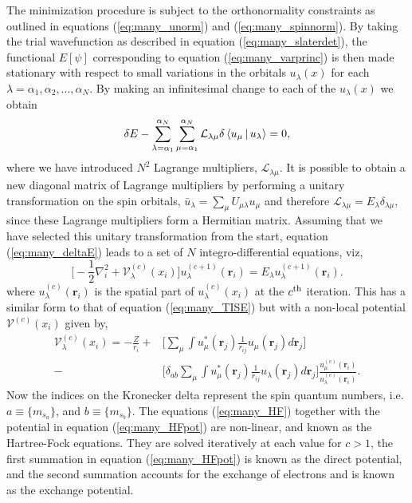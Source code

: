 The minimization procedure is subject to the orthonormality constraints as outlined in equations (\ref{eq:many_unorm}) and (\ref{eq:many_spinnorm}). By taking the trial wavefunction as described in equation (\ref{eq:many_slaterdet}), the functional $E[\psi]$ corresponding to equation (\ref{eq:many_varprinc}) is then made stationary with respect to small variations in the orbitals $u_{\lambda}(x)$ for each $\lambda=\alpha_1, \alpha_2,..., \alpha_N$. By making an infinitesimal change to each of the $u_{\lambda}(x)$ we obtain
	\begin{equation}\label{eq:many_deltaE}
	\delta E-\sum^{\alpha_N}_{\lambda = \alpha_1}\sum^{\alpha_N}_{\mu = \alpha_1}\mathcal{L}_{\lambda\mu}\delta\Braket{u_\mu |u_\lambda}=0,
	\end{equation}
where we have introduced $N^2$ Lagrange multipliers, $\mathcal{L}_{\lambda\mu}$. It is possible to obtain a new diagonal matrix of Lagrange multipliers by performing a unitary transformation on the spin orbitals, $\bar{u}_{\lambda} = \sum_{\mu}U_{\mu\lambda} u_{\mu}$ and therefore $\mathcal{L}_{\lambda\mu} = E_{\lambda}\delta_{\lambda\mu}$, since these Lagrange multipliers form a Hermitian matrix. Assuming that we have selected this unitary transformation from the start, equation (\ref{eq:many_deltaE}) leads to a set of $N$ integro-differential equations, viz, 	
       \begin{equation}\label{eq:many_HF}
	\Big[-\frac{1}{2}\nabla_{i}^2+\mathcal{V}^{(c)}_{\lambda}(x_i)\Big]u^{(c+1)}_\lambda(\boldsymbol{r}_i)=E_\lambda u^{(c+1)}_\lambda(\boldsymbol{r}_i).
	\end{equation}
where $u_{\lambda}^{(c)}(\boldsymbol{r}_i)$ is the spatial part of $u^{(c)}_{\lambda}(x_i)$ at the $c^{\rm th}$ iteration. This has a similar form to that of equation (\ref{eq:many_TISE}) but with a non-local potential $\mathcal{V}^{(c)}(x_i)$ given by,
	\begin{equation}\label{eq:many_HFpot}	
		\begin{split}
	\mathcal{V}^{(c)}_{\lambda}(x_i)=-\frac{Z}{r_i} + & \Bigg[\sum_{\mu}\int u_\mu^*(\boldsymbol{r}_j)\frac{1}{r_{ij}}u_\mu(\boldsymbol{r}_j)d\boldsymbol{r}_j\Bigg]   \\
	- & \Bigg[\delta_{ab}\sum_{\mu}\int u_\mu^*(\boldsymbol{r}_j)\frac{1}{r_{ij}}u_\lambda(\boldsymbol{r}_j)d\boldsymbol{r}_j\Bigg] \frac{u_\mu^{(c)}(\boldsymbol{r}_i)}{u_\lambda^{(c)}(\boldsymbol{r}_i)}.
		\end{split}
	\end{equation}
Now the indices on the Kronecker delta represent the spin quantum numbers, i.e. $a\equiv \{m_{s_a}\}$, and $b\equiv \{m_{s_b}\}$. The equations (\ref{eq:many_HF}) together with the potential in equation (\ref{eq:many_HFpot}) are non-linear, and known as the Hartree-Fock equations. They are solved iteratively at each value for $c > 1$, the first summation in equation (\ref{eq:many_HFpot}) is known as the direct potential, and the second summation accounts for the exchange of electrons and is known as the exchange potential.

